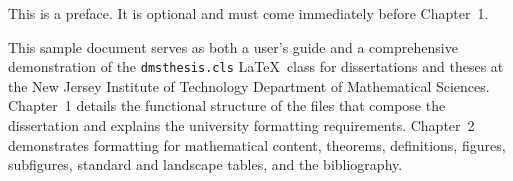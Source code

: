 \begin{preface}

This is a preface. It is optional and must come immediately before Chapter~1.

This sample document serves as both a user's guide and a comprehensive demonstration of the \texttt{dmsthesis.cls} \LaTeX\ class for dissertations and theses at the New Jersey Institute of Technology Department of Mathematical Sciences. Chapter~1 details the functional structure of the files that compose the dissertation and explains the university formatting requirements. Chapter~2 demonstrates formatting for mathematical content, theorems, definitions, figures, subfigures, standard and landscape tables, and the bibliography.

\end{preface}